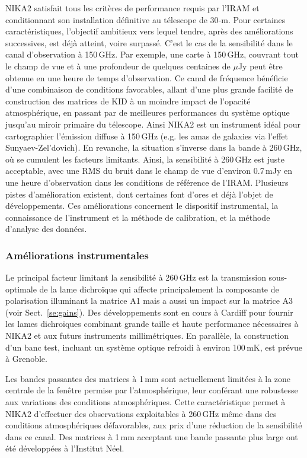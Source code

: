 NIKA2 satisfait tous les critères de performance requis par l'IRAM et
conditionnant son installation définitive au télescope de 30-m. Pour
certaines caractéristiques, l'objectif ambitieux vers lequel tendre,
après des améliorations successives, est déjà atteint, voire
surpassé. C'est le cas de la sensibilité dans le canal d'observation à
150\,GHz. Par exemple, une carte à 150\,GHz, couvrant tout le champ de
vue et à une profondeur de quelques centaines de $\mu$Jy peut être
obtenue en une heure de temps d'observation. Ce canal de fréquence
bénéficie d'une combinaison de conditions favorables, allant d'une plus grande
facilité de construction des matrices de KID à un moindre impact de
l'opacité atmosphérique, en passant par de meilleures performances du
système optique jusqu'au miroir primaire du télescope. Ainsi NIKA2 est
un instrument idéal pour cartographier l'émission diffuse à 150\,GHz
(e.g. les amas de galaxies via l'effet Sunyaev-Zel'dovich). En
revanche, la situation s'inverse dans la bande à 260\,GHz, où se
cumulent les facteurs limitants. Ainsi, la sensibilité à 260\,GHz est
juste acceptable, avec une RMS du bruit dans le champ de vue d'environ
0.7\,mJy en une heure d'observation dans les conditions de référence
de l'IRAM. Plusieurs pistes d'amélioration existent, dont certaines
font d'ores et déjà l'objet de développements. Ces améliorations
concernent le dispositif instrumental, la connaissance de l'instrument
et la méthode de calibration, et la méthode d'analyse des données.

\subsubsection{Améliorations instrumentales}

Le principal facteur limitant la sensibilité à 260\,GHz est la
transmission sous-optimale de la lame dichroïque qui affecte
principalement la composante de polarisation illuminant la matrice A1
mais a aussi un impact sur la matrice A3 (voir
Sect.~\ref{se:gains}). Des développements sont en cours à Cardiff pour
fournir les lames dichroïques combinant grande taille et haute
performance nécessaires à NIKA2 et aux futurs instruments
millimétriques. En parallèle, la construction d'un banc test, incluant
un système optique refroidi à environ 100\,mK, est prévue à Grenoble.

Les bandes passantes des matrices à 1\,mm sont actuellement limitées à
la zone centrale de la fenêtre permise par l'atmosphérique, leur
conférant une robustesse aux variations des conditions atmosphériques.  
Cette caractéristique permet à NIKA2 d'effectuer des observations
exploitables à 260\,GHz même dans des conditions atmosphériques
défavorables, aux prix d'une réduction de la sensibilité dans ce
canal. Des matrices à 1\,mm acceptant une bande passante plus
large ont été développées à l'Institut Néel. 

